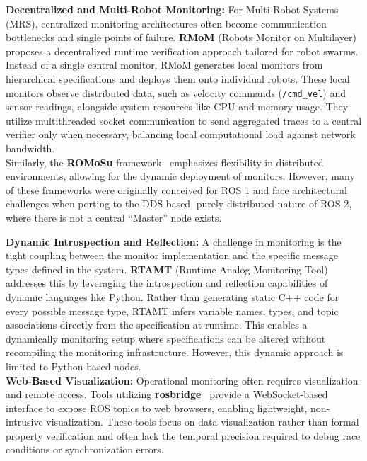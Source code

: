 \textbf{Decentralized and Multi-Robot Monitoring:} For Multi-Robot Systems (MRS), centralized monitoring architectures often become communication bottlenecks and single points of failure. \textbf{RMoM} (Robots Monitor on Multilayer)~\cite{hu2020runtime} proposes a decentralized runtime verification approach tailored for robot swarms. Instead of a single central monitor, RMoM generates local monitors from hierarchical specifications and deploys them onto individual robots. These local monitors observe distributed data, such as velocity commands (\texttt{/cmd\_vel}) and sensor readings, alongside system resources like CPU and memory usage. They utilize multithreaded socket communication to send aggregated traces to a central verifier only when necessary, balancing local computational load against network bandwidth. \\

Similarly, the \textbf{ROMoSu} framework~\cite{stadler2023romosu} emphasizes flexibility in distributed environments, allowing for the dynamic deployment of monitors. However, many of these frameworks were originally conceived for ROS 1 and face architectural challenges when porting to the DDS-based, purely distributed nature of ROS 2, where there is not a central ``Master'' node exists.

\textbf{Dynamic Introspection and Reflection:} A challenge in monitoring is the tight coupling between the monitor implementation and the specific message types defined in the system. \textbf{RTAMT} (Runtime Analog Monitoring Tool)~\cite{Yamaguchi_2023} addresses this by leveraging the introspection and reflection capabilities of dynamic languages like Python. Rather than generating static C++ code for every possible message type, RTAMT infers variable names, types, and topic associations directly from the specification at runtime. This enables a dynamically monitoring setup where specifications can be altered without recompiling the monitoring infrastructure. However, this dynamic approach is limited to Python-based nodes. \\

\textbf{Web-Based Visualization:} Operational monitoring often requires visualization and remote access. Tools utilizing \textbf{rosbridge}~\cite{Crick2011RosbridgeRF} provide a WebSocket-based interface to expose ROS topics to web browsers, enabling lightweight, non-intrusive visualization. These tools focus on data visualization rather than formal property verification and often lack the temporal precision required to debug race conditions or synchronization errors. \\

